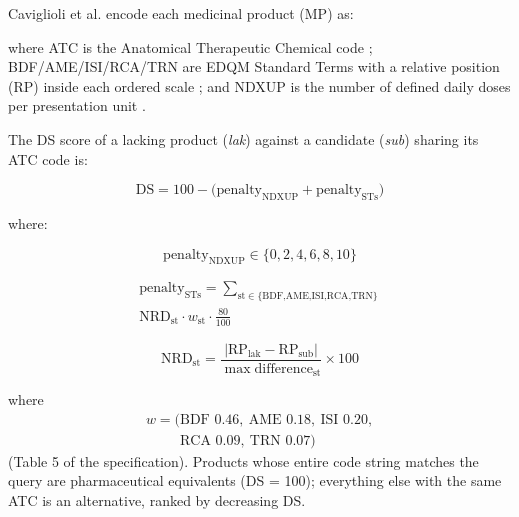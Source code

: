 \documentclass[a4paper]{elsarticle}
\begin{document}
Caviglioli et al.\citep{caviglioli2025medicine} encode each medicinal product (MP) as:


where ATC is the Anatomical Therapeutic Chemical code \citep{who2026atcddd}; BDF/AME/ISI/RCA/TRN are EDQM Standard Terms with a relative position (RP) inside each ordered scale \citep{edqm2024standard,iso202311239}; and NDXUP is the number of defined daily doses per presentation unit \citep{who2026atcddd}.

The DS score of a lacking product (\emph{lak}) against a candidate (\emph{sub}) sharing its ATC code is:

\begin{equation}
\text{DS} = 100 - \bigl(\text{penalty}_{\text{NDXUP}} + \text{penalty}_{\text{STs}}\bigr)
\label{eq:ds}
\end{equation}

where:

\begin{equation}
\text{penalty}_{\text{NDXUP}} \in \{0,2,4,6,8,10\}
\label{eq:ndxup}
\end{equation}

\begin{equation}
\begin{gathered}
\text{penalty}_{\text{STs}} = \sum_{\text{st}\in\{\text{BDF,AME,ISI,RCA,TRN}\}} \\
\text{NRD}_{\text{st}} \cdot w_{\text{st}} \cdot \frac{80}{100}
\end{gathered}
\label{eq:st}
\end{equation}

\begin{equation}
\text{NRD}_{\text{st}} = \frac{|\text{RP}_{\text{lak}} - \text{RP}_{\text{sub}}|}{\max\text{difference}_{\text{st}}} \times 100
\label{eq:nrd}
\end{equation}

where
\begin{equation*}
\begin{gathered}
w = (\text{BDF }0.46,\ \text{AME }0.18,\ \text{ISI }0.20,\\
\phantom{w = (}\text{RCA }0.09,\ \text{TRN }0.07)
\end{gathered}
\end{equation*}
(Table 5 of the specification).
Products whose entire code string matches the query are pharmaceutical equivalents (DS = 100); everything else with the same ATC is an alternative, ranked by decreasing DS.
\end{document}
